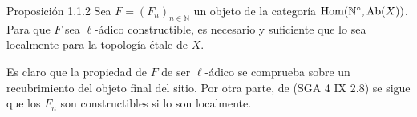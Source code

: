 \begin{statement}{Proposición 1.1.2}
Sea \(F=(F_n)_{n\in\mathbb N}\) un objeto de la categoría \(\operatorname{Hom}(\mathbb N^\circ,\operatorname{Ab}(X))\). Para que \(F\) sea \(\ell\)-ádico constructible, es necesario y suficiente que lo sea localmente para la topología étale de \(X\).
\end{statement}

\begin{prooftext}[Demostración]
Es claro que la propiedad de \(F\) de ser \(\ell\)-ádico se comprueba sobre un recubrimiento del objeto final del sitio. Por otra parte, de (SGA 4 IX 2.8) se sigue que los \(F_n\) son constructibles si lo son localmente.
\end{prooftext}
